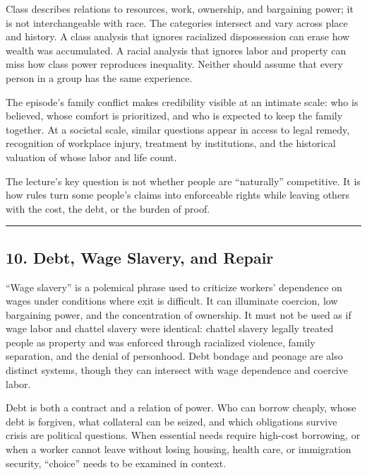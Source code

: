 \documentclass[
  11pt,
  letterpaper,
]{article}
\begin{document}
Class describes relations to resources, work, ownership, and bargaining
power; it is not interchangeable with race. The categories intersect and
vary across place and history. A class analysis that ignores racialized
dispossession can erase how wealth was accumulated. A racial analysis
that ignores labor and property can miss how class power reproduces
inequality. Neither should assume that every person in a group has the
same experience.

The episode's family conflict makes credibility visible at an intimate
scale: who is believed, whose comfort is prioritized, and who is
expected to keep the family together. At a societal scale, similar
questions appear in access to legal remedy, recognition of workplace
injury, treatment by institutions, and the historical valuation of whose
labor and life count.

The lecture's key question is not whether people are ``naturally''
competitive. It is how rules turn some people's claims into enforceable
rights while leaving others with the cost, the debt, or the burden of
proof.

\begin{center}\rule{0.5\linewidth}{0.5pt}\end{center}

\subsection{10. Debt, Wage Slavery, and
Repair}\label{debt-wage-slavery-and-repair}

``Wage slavery'' is a polemical phrase used to criticize workers'
dependence on wages under conditions where exit is difficult. It can
illuminate coercion, low bargaining power, and the concentration of
ownership. It must not be used as if wage labor and chattel slavery were
identical: chattel slavery legally treated people as property and was
enforced through racialized violence, family separation, and the denial
of personhood. Debt bondage and peonage are also distinct systems,
though they can intersect with wage dependence and coercive labor.

Debt is both a contract and a relation of power. Who can borrow cheaply,
whose debt is forgiven, what collateral can be seized, and which
obligations survive crisis are political questions. When essential needs
require high-cost borrowing, or when a worker cannot leave without
losing housing, health care, or immigration security, ``choice'' needs
to be examined in context.
\end{document}
